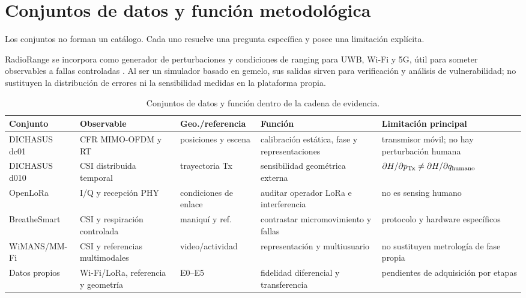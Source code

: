 \section{Conjuntos de datos y función metodológica}

Los conjuntos no forman un catálogo. Cada uno resuelve una pregunta específica y posee una limitación explícita.

RadioRange se incorpora como generador de perturbaciones y condiciones de ranging
para UWB, Wi-Fi y 5G, útil para someter observables a fallas controladas
\citep{Lyu2026RadioRange}. Al ser un simulador basado en gemelo, sus salidas sirven
para verificación y análisis de vulnerabilidad; no sustituyen la distribución de
errores ni la sensibilidad medidas en la plataforma propia.

\begin{table}[htbp]
\centering\scriptsize
\caption{Conjuntos de datos y función dentro de la cadena de evidencia.}
\label{tab:datasets_roles}
\begin{tabularx}{\textwidth}{P{2.25cm}P{2.45cm}P{2.3cm}L L}
\toprule
Conjunto & Observable & Geo./referencia & Función & Limitación principal\\
\midrule
DICHASUS dc01 \citep{Euchner2023DICHASUSdcxx,DICHASUSdcxxWeb} & CFR MIMO-OFDM y RT & posiciones y escena & calibración estática, fase y representaciones & transmisor móvil; no hay perturbación humana\\
DICHASUS d010 \citep{DICHASUSd010Web} & CSI distribuida temporal & trayectoria Tx & sensibilidad geométrica externa & $\partial H/\partial p_{\rm Tx}\ne\partial H/\partial q_{\rm humano}$\\
OpenLoRa \citep{Mishra2023OpenLoRa} & I/Q y recepción PHY & condiciones de enlace & auditar operador LoRa e interferencia & no es sensing humano\\
BreatheSmart \citep{Mosleh2022BreatheSmart} & CSI y respiración controlada & maniquí y ref. & contrastar micromovimiento y fallas & protocolo y hardware específicos\\
WiMANS/MM-Fi \citep{Huang2024WiMANS,Yang2023MMFi} & CSI y referencias multimodales & video/actividad & representación y multiusuario & no sustituyen metrología de fase propia\\
Datos propios & Wi-Fi/LoRa, referencia y geometría & E0--E5 & fidelidad diferencial y transferencia & pendientes de adquisición por etapas\\
\bottomrule
\end{tabularx}
\end{table}

